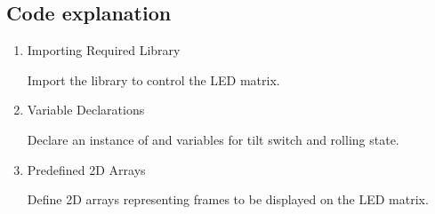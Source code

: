 \documentclass[a4paper,11pt,english]{sphinxmanual}
\begin{document}
\subsection{Code explanation}
\label{\detokenize{Extension_Project/Digital_Dice_LED_Matrix:code-explanation}}\begin{enumerate}
%
\item {} 
\sphinxAtStartPar
Importing Required Library

\sphinxAtStartPar
Import the  library to control the LED matrix.

\begin{sphinxVerbatim}[commandchars=\\\{\}]
\end{sphinxVerbatim}

\item {} 
\sphinxAtStartPar
Variable Declarations

\sphinxAtStartPar
Declare an instance of  and variables for tilt switch and rolling state.

\begin{sphinxVerbatim}[commandchars=\\\{\}]
\end{sphinxVerbatim}

\item {} 
\sphinxAtStartPar
Pre\sphinxhyphen{}defined 2D Arrays

\sphinxAtStartPar
Define 2D arrays representing frames to be displayed on the LED matrix.


\end{enumerate}
\end{document}
